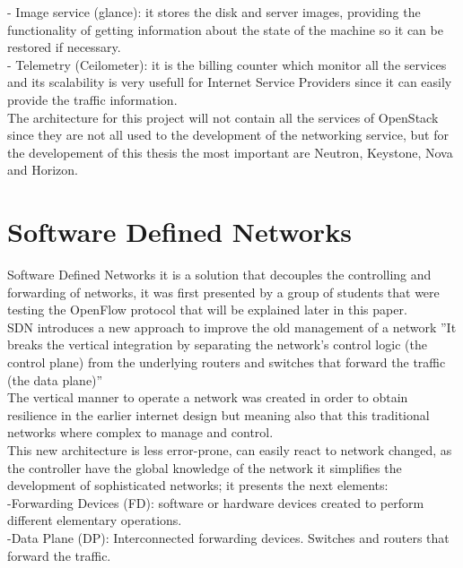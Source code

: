 - Image service (glance): it stores the disk and server images, providing the functionality of getting information about the state of the machine so it can be restored if necessary. \\

- Telemetry (Ceilometer): it is the billing counter which monitor all the services and its scalability is very usefull for Internet Service Providers since it can easily provide the traffic information.\\
 
The architecture for this project will not contain all the services of OpenStack since they are not all used to the development of the networking service, but for the developement of this thesis the most important are Neutron, Keystone, Nova and Horizon.\\
 
 
\section{Software Defined Networks}
 
Software Defined Networks it is a solution that decouples the controlling and forwarding of networks, it was first presented by a group of students that were testing the OpenFlow protocol that will be explained later in this paper.\\
 
SDN introduces a new approach to improve the old management of a network ”It breaks the vertical integration by separating the network’s control logic (the control plane) from the underlying routers and switches that forward the traffic (the data plane)”\cite{1}\\
 
The vertical manner to operate a network was created in order to obtain resilience in the earlier internet design but meaning also that this traditional networks where complex to manage and control.\\
 
This new architecture is less error-prone, can easily react to network changed, as the controller have the global knowledge of the network it simplifies the
development of sophisticated networks; it presents the next elements:\\
 
-Forwarding Devices (FD): software or hardware devices created to perform different elementary operations.\\
 
-Data Plane (DP): Interconnected forwarding devices. Switches and routers that forward the traffic.\\

